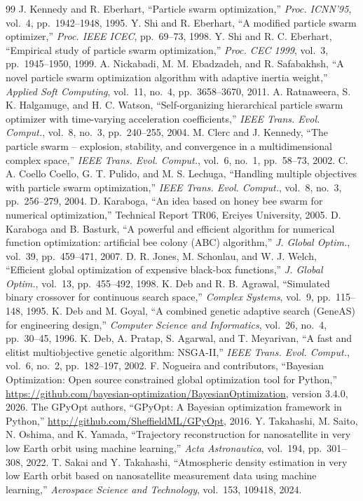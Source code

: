 \documentclass[11pt,a4paper,dvipdfmx]{jsarticle}
\begin{document}
\begin{thebibliography}{99}
 J. Kennedy and R. Eberhart, ``Particle swarm optimization,'' \textit{Proc. ICNN'95}, vol.~4, pp.~1942--1948, 1995.
 Y. Shi and R. Eberhart, ``A modified particle swarm optimizer,'' \textit{Proc. IEEE ICEC}, pp.~69--73, 1998.
 Y. Shi and R. C. Eberhart, ``Empirical study of particle swarm optimization,'' \textit{Proc. CEC 1999}, vol.~3, pp.~1945--1950, 1999.
 A. Nickabadi, M. M. Ebadzadeh, and R. Safabakhsh, ``A novel particle swarm optimization algorithm with adaptive inertia weight,'' \textit{Applied Soft Computing}, vol.~11, no.~4, pp.~3658--3670, 2011.
 A. Ratnaweera, S. K. Halgamuge, and H. C. Watson, ``Self-organizing hierarchical particle swarm optimizer with time-varying acceleration coefficients,'' \textit{IEEE Trans. Evol. Comput.}, vol.~8, no.~3, pp.~240--255, 2004.
 M. Clerc and J. Kennedy, ``The particle swarm -- explosion, stability, and convergence in a multidimensional complex space,'' \textit{IEEE Trans. Evol. Comput.}, vol.~6, no.~1, pp.~58--73, 2002.
 C. A. Coello Coello, G. T. Pulido, and M. S. Lechuga, ``Handling multiple objectives with particle swarm optimization,'' \textit{IEEE Trans. Evol. Comput.}, vol.~8, no.~3, pp.~256--279, 2004.
 D. Karaboga, ``An idea based on honey bee swarm for numerical optimization,'' Technical Report TR06, Erciyes University, 2005.
 D. Karaboga and B. Basturk, ``A powerful and efficient algorithm for numerical function optimization: artificial bee colony (ABC) algorithm,'' \textit{J. Global Optim.}, vol.~39, pp.~459--471, 2007.
 D. R. Jones, M. Schonlau, and W. J. Welch, ``Efficient global optimization of expensive black-box functions,'' \textit{J. Global Optim.}, vol.~13, pp.~455--492, 1998.
 K. Deb and R. B. Agrawal, ``Simulated binary crossover for continuous search space,'' \textit{Complex Systems}, vol.~9, pp.~115--148, 1995.
 K. Deb and M. Goyal, ``A combined genetic adaptive search (GeneAS) for engineering design,'' \textit{Computer Science and Informatics}, vol.~26, no.~4, pp.~30--45, 1996.
 K. Deb, A. Pratap, S. Agarwal, and T. Meyarivan, ``A fast and elitist multiobjective genetic algorithm: NSGA-II,'' \textit{IEEE Trans. Evol. Comput.}, vol.~6, no.~2, pp.~182--197, 2002.
 F. Nogueira and contributors, ``Bayesian Optimization: Open source constrained global optimization tool for Python,'' \url{https://github.com/bayesian-optimization/BayesianOptimization}, version 3.4.0, 2026.
 The GPyOpt authors, ``GPyOpt: A Bayesian optimization framework in Python,'' \url{http://github.com/SheffieldML/GPyOpt}, 2016.
 Y. Takahashi, M. Saito, N. Oshima, and K. Yamada, ``Trajectory reconstruction for nanosatellite in very low Earth orbit using machine learning,'' \textit{Acta Astronautica}, vol.~194, pp.~301--308, 2022.
 T. Sakai and Y. Takahashi, ``Atmospheric density estimation in very low Earth orbit based on nanosatellite measurement data using machine learning,'' \textit{Aerospace Science and Technology}, vol.~153, 109418, 2024.
\end{thebibliography}
\end{document}
